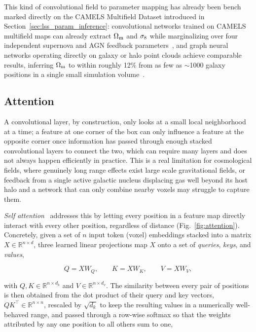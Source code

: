 This kind of convolutional field to parameter mapping has already been bench marked directly on the CAMELS Multifield Dataset introduced in Section~\ref{sec:lss_param_inference}: convolutional networks trained on CAMELS multifield maps can already extract $\Omega_\mathrm{m}$ and $\sigma_8$ while marginalizing over four independent supernova and AGN feedback parameters~\citep{villaescusanavarro2021multifieldcosmologyartificialintelligence}, and graph neural networks operating directly on galaxy or halo point clouds achieve comparable results, inferring $\Omega_\mathrm{m}$ to within roughly 12\% from as few as $\sim$1000 galaxy positions in a single small simulation volume~\citep{Villanueva_Domingo_2022}.

\subsection{Attention}
\label{sec:attention}

A convolutional layer, by construction, only looks at a small local
neighborhood at a time; a feature at one corner of the box can only
influence a feature at the opposite corner once information has passed
through enough stacked convolutional layers to connect the two, which can
require many layers and does not always happen efficiently in practice.
This is a real limitation for cosmological fields, where genuinely
long range effects exist large scale gravitational fields, or
feedback from a single active galactic nucleus displacing gas well beyond
its host halo and a network that can only combine nearby voxels may
struggle to capture them.

\emph{Self attention}~\citep{vaswani_attention_2023} addresses this by
letting every position in a feature map directly interact with every other
position, regardless of distance (Fig.~\ref{fig:attention}). Concretely,
given a set of $n$ input token (voxel) embeddings stacked into a matrix
$X\in\mathbb{R}^{n\times d}$, three learned linear projections map $X$ onto
a set of \emph{queries}, \emph{keys}, and \emph{values},

\begin{equation}
    Q = XW_Q, \qquad K = XW_K, \qquad V = XW_V,
    \label{eq:qkv}
\end{equation}

with $Q,K\in\mathbb{R}^{n\times d_k}$ and $V\in\mathbb{R}^{n\times d_v}$.
The similarity between every pair of positions is then obtained from the
dot product of their query and key vectors, $QK^\top\in\mathbb{R}^{n\times
n}$, rescaled by $\sqrt{d_k}$ to keep the resulting values in a numerically
well-behaved range, and passed through a row-wise softmax so that the
weights attributed by any one position to all others sum to one,

